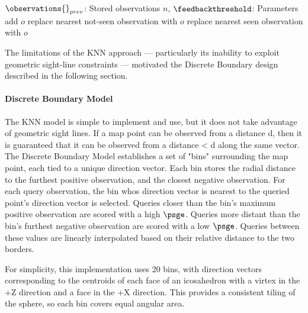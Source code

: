 \begin{singlespace}
    \begin{algorithm}[H]
        \caption[KNN Model Update]{KNN $\update{o, \feedback}$}
        \label{alg:knn_update}
        \begin{algorithmic}
            \Require $\observations{}_{prev}$: Stored observations
            \Require $n$, $\feedbackthreshold$: Parameters
            \State add $o$
            \State \Return
            \EndIf
            \If{$|\feedback| < \feedbackthreshold$}
            \State \Return
            \EndIf
            \State replace nearest not-seen observation with $o$
            \Else
            \State replace nearest seen observation with $o$
            \EndIf
            \EndFunction
        \end{algorithmic}
    \end{algorithm}
\end{singlespace}

The limitations of the KNN approach — particularly its inability to exploit geometric sight-line constraints — motivated the Discrete Boundary design described in the following section.

\paragraph{Discrete Boundary Model}

The KNN model is simple to implement and use, but it does not take advantage of geometric sight lines. If a map point can be observed from a distance d, then it is guaranteed that it can be observed from a distance < d along the same vector. The Discrete Boundary Model establishes a set of "bins" surrounding the map point, each tied to a unique direction vector. Each bin stores the radial distance to the furthest positive observation, and the closest negative observation. For each query observation, the bin whos direction vector is nearest to the queried point's direction vector is selected. Queries closer than the bin's maximum positive observation are scored with a high $\psge$. Queries more distant than the bin's furthest negative observation are scored with a low $\psge$. Queries between these values are linearly interpolated based on their relative distance to the two borders.

For simplicity, this implementation uses 20 bins, with direction vectors corresponding to the centroids of each face of an icosahedron with a virtex in the +Z direction and a face in the +X direction. This provides a consistent tiling of the sphere, so each bin covers equal angular area.

